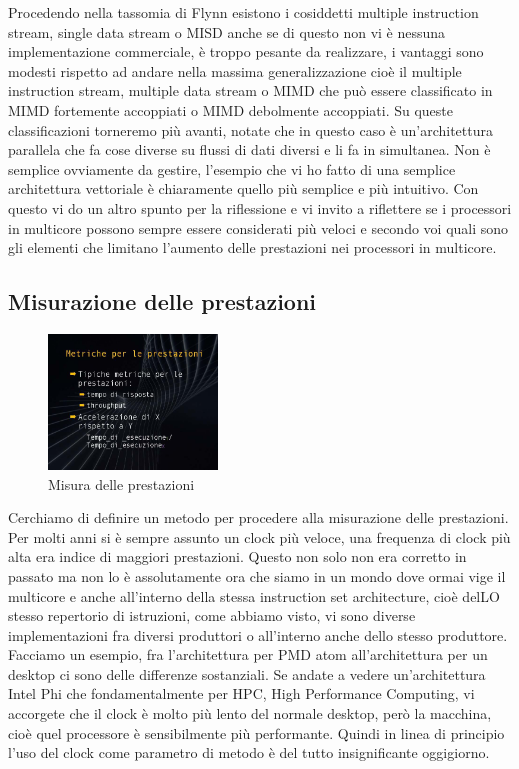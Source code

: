 Procedendo nella tassomia di Flynn esistono i cosiddetti multiple instruction stream, single data stream o MISD anche se di questo non vi è nessuna implementazione commerciale, è troppo pesante da realizzare, i vantaggi sono modesti rispetto ad andare nella massima generalizzazione cioè il multiple instruction stream, multiple data stream o MIMD che può essere classificato in MIMD fortemente accoppiati o MIMD debolmente accoppiati.
Su queste classificazioni torneremo più avanti, notate che in questo caso è un'architettura parallela che fa cose diverse su flussi di dati diversi e li fa in simultanea.
Non è semplice ovviamente da gestire, l'esempio che vi ho fatto di una semplice architettura vettoriale è chiaramente quello più semplice e più intuitivo.
Con questo vi do un altro spunto per la riflessione e vi invito a riflettere se i processori in multicore possono sempre essere considerati più veloci e secondo voi quali sono gli elementi che limitano l'aumento delle prestazioni nei processori in multicore.

\subsection{Misurazione delle prestazioni}

\FloatBarrier
\begin{figure}[H]
  \centering
  \includegraphics[width=0.40\textwidth,
                    trim=40 40 10 40, %
                    clip]
                    {images/Lez03_p03_fig_03.png}
  \caption{Misura delle prestazioni}
  \label{fig:Lez03_p03_fig_03}
\end{figure}
\FloatBarrier
\noindent

Cerchiamo di definire un metodo per procedere alla misurazione delle prestazioni.
Per molti anni si è sempre assunto un clock più veloce, una frequenza di clock più alta era indice di maggiori prestazioni.
Questo non solo non era corretto in passato ma non lo è assolutamente ora che siamo in un mondo dove ormai vige il multicore e anche all'interno della stessa instruction set architecture, cioè delLO stesso repertorio di istruzioni, come abbiamo visto, vi sono diverse implementazioni fra diversi produttori o all'interno anche dello stesso produttore.
Facciamo un esempio, fra l'architettura per PMD atom all'architettura per un desktop ci sono delle differenze sostanziali.
Se andate a vedere un'architettura Intel Phi che fondamentalmente per HPC, High Performance Computing, vi accorgete che il clock è molto più lento del normale desktop, però la macchina, cioè quel processore è sensibilmente più performante.
Quindi in linea di principio l'uso del clock come parametro di metodo è del tutto insignificante oggigiorno.

